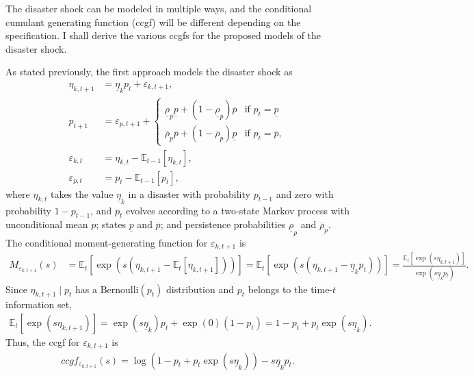 \documentclass[12 pt, oneside]{article}
\theoremstyle{definition}
\theoremstyle{definition}
\theoremstyle{definition}
\newcommand{\E}{\mathbb{E}}
\begin{document}
The disaster shock can be modeled in multiple ways, and the conditional cumulant generating function (ccgf) will be different depending on the specification. I shall derive the various ccgfs for the proposed models of the disaster shock.

As stated previously, the first approach models the disaster shock as
\begin{align}
  \eta_{k, t + 1} & = \underline{\eta}_k p_t + \varepsilon_{k, t + 1},\\
  p_{t + 1} & = \varepsilon_{p, t + 1} + \begin{cases}
    \underline{\rho}_p \underline{p} + (1 - \underline{\rho}_p) \overline{p} & \text{if } p_t = \underline{p}\\
    \overline{\rho}_p \overline{p} + (1 - \overline{\rho}_p) \underline{p} & \text{if } p_t = \overline{p},
  \end{cases}\\
  \varepsilon_{k, t} & = \eta_{k, t} - \E_{t- 1}[\eta_{k, t}],\\
  \varepsilon_{p, t} & = p_t - \E_{t - 1}[p_t],
\end{align}
where $\eta_{k, t}$ takes the value $\underline{\eta}_k$ in a disaster with probability $p_{t - 1}$ and zero with probability $1 - p_{t - 1}$, and $p_t$ evolves according to a two-state Markov process with unconditional mean $p$; states $\underline{p}$ and $\overline{p}$; and persistence probabilities $\underline{\rho}_p$ and $\overline{\rho}_p$. The conditional moment-generating function for $\varepsilon_{k, t + 1}$ is
\begin{align*}
  M_{\varepsilon_{k, t + 1}}(s) & = \E_t[\exp(s (\eta_{k, t + 1} - \E_t[\eta_{k, t + 1}]))] = \E_t[\exp(s (\eta_{k, t + 1} - \underline{\eta}_k p_t))] = \frac{\E_t[\exp(s \eta_{k, t + 1})]}{\exp(s\underline{\eta}_kp_t)}.
\end{align*}
Since $\eta_{k, t + 1} \mid p_t$ has a $\text{Bernoulli}(p_t)$ distribution and $p_t$ belongs to the time-$t$ information set,
\begin{align*}
  \E_t[\exp(s\eta_{k, t + 1})] = \exp(s \underline{\eta}_k)p_t + \exp(0)(1 - p_t) = 1 - p_t + p_t\exp(s \underline{\eta}_k).
\end{align*}
Thus, the ccgf for $\varepsilon_{k, t + 1}$ is
\begin{align}\label{eq:ccgf bernoulli disaster indicator}
  ccgf_{\varepsilon_{k, t + 1}}(s) = \log(1 - p_t + p_t \exp(s \underline{\eta}_k)) - s\underline{\eta}_k p_t.
\end{align}
\end{document}
